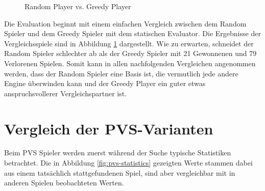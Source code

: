 \begin{figure}[!ht]
    \centering
    \caption{Random Player vs. Greedy Player}
    \label{fig:random-greedy-comparison}
\end{figure}

Die Evaluation beginnt mit einem einfachen Vergleich zwischen dem Random Spieler und dem Greedy Spieler mit dem statischen Evaluator. Die Ergebnisse der Vergleichsspiele sind in Abbildung \ref{fig:random-greedy-comparison} dargestellt. Wie zu erwarten, schneidet der Random Spieler schlechter ab als der Greedy Spieler mit 21 Gewonnenen und 79 Verlorenen Spielen. Somit kann in allen nachfolgenden Vergleichen angenommen werden, dass der Random Spieler eine Basis ist, die vermutlich jede andere Engine überwinden kann und der Greedy Player ein guter etwas anspruchsvollerer Vergleichspartner ist.

\section{Vergleich der PVS-Varianten}

Beim \ac{PVS} Spieler werden zuerst während der Suche typische Statistiken betrachtet. Die in Abbildung \ref{fig:pvs-statistics} gezeigten Werte stammen dabei aus einem tatsächlich stattgefundenen Spiel, sind aber vergleichbar mit in anderen Spielen beobachteten Werten.

